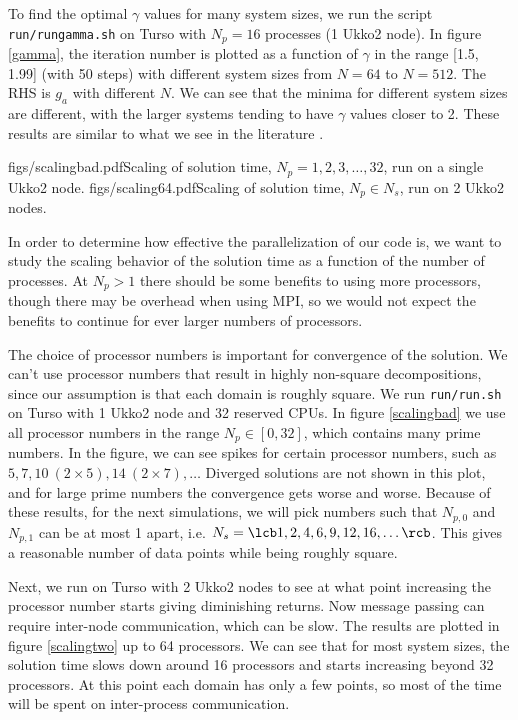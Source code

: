 \documentclass[10pt]{article}
\begin{document}
To find the optimal $\gamma$ values for many system sizes, we run the script \verb|run/rungamma.sh| on Turso with $N_p=16$ processes (1 Ukko2 node). In figure \ref{gamma}, the iteration number is plotted as a function of $\gamma$ in the range [1.5, 1.99] (with 50 steps) with different system sizes from $N = 64$ to $N= 512$. The RHS is $g_a$ with different $N$. We can see that the minima for different system sizes are different, with the larger systems tending to have $\gamma$ values closer to 2. These results are similar to what we see in the literature \cite{rel}.

\dualfig
{figs/scalingbad.pdf}{Scaling of solution time, $N_p = 1, 2, 3, \ldots, 32$, run on a single Ukko2 node.\label{scalingbad}}
{figs/scaling64.pdf}{Scaling of solution time, $N_p \in N_s$, run on 2 Ukko2 nodes.\label{scalingtwo}}

In order to determine how effective the parallelization of our code is, we want to study the scaling behavior of the solution time as a function of the number of processes. At $N_p > 1$ there should be some benefits to using more processors, though there may be overhead when using MPI, so we would not expect the benefits to continue for ever larger numbers of processors.

The choice of processor numbers is important for convergence of the solution. We can't use processor numbers that result in highly non-square decompositions, since our assumption is that each domain is roughly square. We run \verb|run/run.sh| on Turso with 1 Ukko2 node and 32 reserved CPUs. In figure \ref{scalingbad} we use all processor numbers in the range $N_p \in [0, 32]$, which contains many prime numbers. In the figure, we can see spikes for certain processor numbers, such as $5, 7, 10 \ (2\times5), 14 \ (2\times7), \ldots$ Diverged solutions are not shown in this plot, and for large prime numbers the convergence gets worse and worse. Because of these results, for the next simulations, we will pick numbers such that $N_{p, 0}$ and $N_{p, 1}$ can be at most 1 apart, i.e. $N_s = \lcb 1, 2, 4, 6, 9, 12, 16, \ldots \rcb$. This gives a reasonable number of data points while being roughly square.

Next, we run on Turso with 2 Ukko2 nodes to see at what point increasing the processor number starts giving diminishing returns. Now message passing can require inter-node communication, which can be slow. The results are plotted in figure \ref{scalingtwo} up to 64 processors. We can see that for most system sizes, the solution time slows down around 16 processors and starts increasing beyond 32 processors. At this point each domain has only a few points, so most of the time will be spent on inter-process communication.
\end{document}

